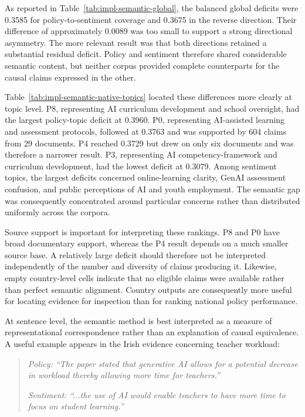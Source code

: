 As reported in Table~\ref{tab:impl-semantic-global}, the balanced global deficits
were 0.3585 for policy-to-sentiment coverage and 0.3675 in the reverse direction.
Their difference of approximately 0.0089 was too small to support a strong
directional asymmetry. The more relevant result was that both directions retained
a substantial residual deficit. Policy and sentiment therefore shared considerable
semantic content, but neither corpus provided complete counterparts for the causal
claims expressed in the other.

Table~\ref{tab:impl-semantic-native-topics} located these differences more clearly
at topic level. P8, representing AI curriculum development and school oversight,
had the largest policy-topic deficit at 0.3960. P0, representing AI-assisted
learning and assessment protocols, followed at 0.3763 and was supported by 604
claims from 29 documents. P4 reached 0.3729 but drew on only six documents and was
therefore a narrower result. P3, representing AI competency-framework and curriculum
development, had the lowest deficit at 0.3079. Among sentiment topics, the largest
deficits concerned online-learning clarity, GenAI assessment confusion, and public
perceptions of AI and youth employment. The semantic gap was consequently
concentrated around particular concerns rather than distributed uniformly across
the corpora.

Source support is important for interpreting these rankings. P8 and P0 have broad
documentary support, whereas the P4 result depends on a much smaller source base.
A relatively large deficit should therefore not be interpreted independently of
the number and diversity of claims producing it. Likewise, empty country-level
cells indicate that no eligible claims were available rather than perfect semantic
alignment. Country outputs are consequently more useful for locating evidence for
inspection than for ranking national policy performance.

At sentence level, the semantic method is best interpreted as a measure of
representational correspondence rather than an explanation of causal equivalence.
A useful example appears in the Irish evidence concerning teacher workload:

\begin{quote}
\textit{Policy: ``The paper stated that generative AI allows for a potential
decrease in workload thereby allowing more time for teachers.''}

\textit{Sentiment: ``...the use of AI would enable teachers to have more time
to focus on student learning.''}
\end{quote}

